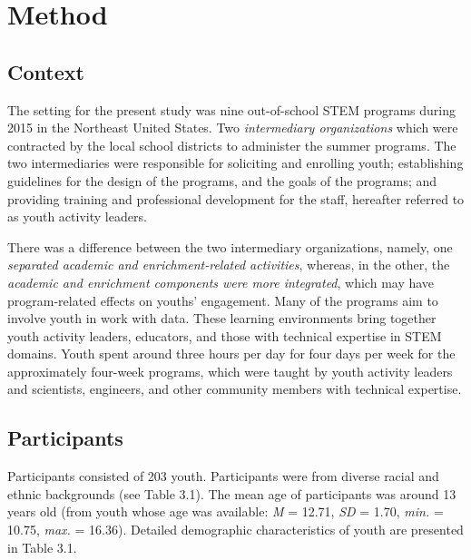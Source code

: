 \documentclass[]{msu-thesis}
\theoremstyle{definition}
\theoremstyle{definition}
\theoremstyle{definition}
\theoremstyle{remark}
\begin{document}
\chapter{Method}\label{method}

\section{Context}\label{context}

The setting for the present study was nine out-of-school STEM programs
during 2015 in the Northeast United States. Two \emph{intermediary
organizations} which were contracted by the local school districts to
administer the summer programs. The two intermediaries were responsible
for soliciting and enrolling youth; establishing guidelines for the
design of the programs, and the goals of the programs; and providing
training and professional development for the staff, hereafter referred
to as youth activity leaders.

There was a difference between the two intermediary organizations,
namely, one \emph{separated academic and enrichment-related activities},
whereas, in the other, the \emph{academic and enrichment components were
more integrated}, which may have program-related effects on youths'
engagement. Many of the programs aim to involve youth in work with data.
These learning environments bring together youth activity leaders,
educators, and those with technical expertise in STEM domains. Youth
spent around three hours per day for four days per week for the
approximately four-week programs, which were taught by youth activity
leaders and scientists, engineers, and other community members with
technical expertise.

\section{Participants}\label{participants}

Participants consisted of 203 youth. Participants were from diverse
racial and ethnic backgrounds (see Table 3.1). The mean age of
participants was around 13 years old (from youth whose age was
available: \emph{M} = 12.71, \emph{SD} = 1.70, \emph{min.} = 10.75,
\emph{max.} = 16.36). Detailed demographic characteristics of youth are
presented in Table 3.1.
\end{document}

